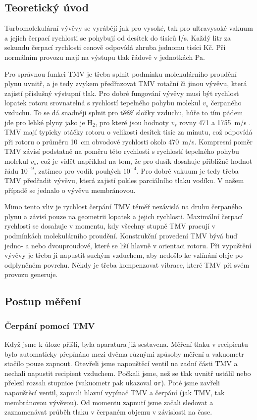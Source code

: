 \documentclass[english]{article}
\begin{document}
    \subsection{Teoretický úvod}
    		Turbomolekulární vývěvy se vyrábějí jak pro vysoké, tak pro ultravysoké vakuum a jejich čerpací rychlosti se pohybují od desítek do tisíců l/s. Každý litr za sekundu čerpací rychlosti cenově odpovídá zhruba jednomu tisíci Kč. Při normálním provozu mají na výstupu tlak řádově v jednotkách Pa. 
    		
    		Pro správnou funkci TMV je třeba splnit podmínku molekulárního proudění plynu uvnitř, a je tedy zvykem předřazovat TMV rotační či jinou vývěvu, která zajistí příslušný výstupní tlak. Pro dobré fungování vývěvy musí být rychlost lopatek rotoru srovnatelná s rychlostí tepelného pohybu molekul $v_s$ čerpaného vzduchu. To se dá snadněji splnit pro těžší složky vzduchu, hůře to tím pádem jde pro lehké plyny jako je $\mathrm{H_2}$, pro které jsou hodnoty $v_s$ rovny 471 a 1755~m/s \cite{bib:praskripta}. TMV mají typicky otáčky rotoru o velikosti desítek tisíc za minutu, což odpovídá při rotoru o průměru 10~cm obvodové rychlosti okolo 470~m/s. Kompresní poměr TMV závisí podstatně na poměru této rychlosti s rychlostí tepelného pohybu molekul $v_s$, což je vidět například na tom, že pro dusík dosahuje přibližně hodnot řádu $10^{-9}$, zatímco pro vodík pouhých $10^{-4}$. Pro dobré vakuum je tedy třeba TMV předřadit vývěvu, která zajistí pokles parciálního tlaku vodíku. V našem případě se jednalo o vývěvu membránovou.
    		
    		Mimo tento vliv je rychlost čerpání TMV téměř nezávislá na druhu čerpaného plynu a závisí pouze na geometrii lopatek a jejich rychlosti. Maximální čerpací rychlosti se dosahuje v momentu, kdy všechny stupně TMV pracují v podmínkách molekulárního proudění. Konstrukční provedení TMV bývá buď jedno- a nebo dvouproudové, které se liší hlavně v orientaci rotoru. Při vypuštění vývěvy je třeba ji napustit suchým vzduchem, aby nedošlo ke vzlínání oleje po odplyněném povrchu. Někdy je třeba kompenzovat vibrace, které TMV při svém provozu generuje.
    
    \subsection{Postup měření}	
    	\subsubsection{Čerpání pomocí TMV}
	    	Když jsme k úloze přišli, byla aparatura již sestavena. Měření tlaku v recipientu bylo automaticky přepínáno mezi dvěma různými způsoby měření a vakuometr stačilo pouze zapnout. Otevřeli jsme napouštěcí ventil na zadní části TMV a nechali napustit recipient vzduchem. Počkali jsme, než se tlak uvnitř ustálil nebo přelezl rozsah stupnice (vakuometr pak ukazoval \texttt{or}). Poté jsme zavřeli napouštěcí ventil, zapnuli hlavní vypínač TMV a čerpání (jak TMV, tak membránovou vývěvou). Od momentu zapnutí jsme začali sledovat a zaznamenávat průběh tlaku v čerpaném objemu v závislosti na čase. 
	
\end{document}
